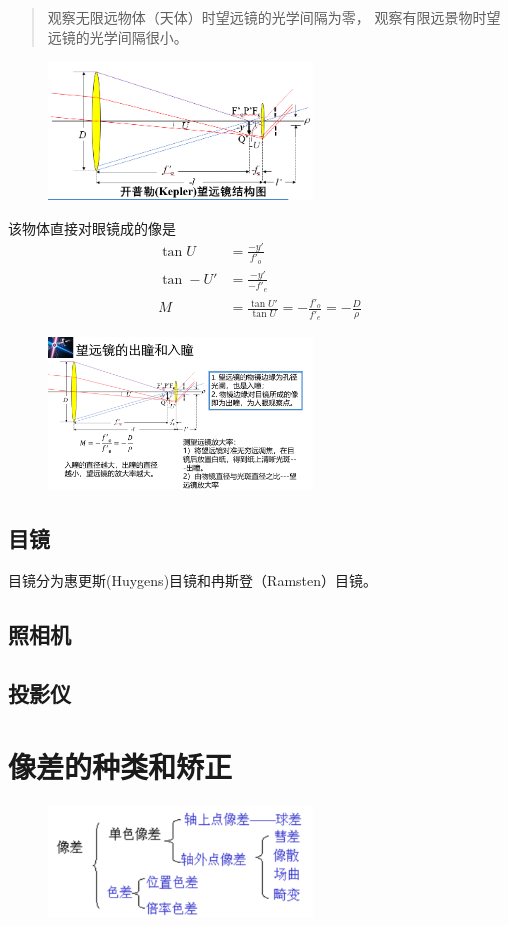 \begin{quote}
{\qquad{}\ccwd\kaishu{}
观察无限远物体（天体）时望远镜的光学间隔为零，
观察有限远景物时望远镜的光学间隔很小。

}
\end{quote}
        \begin{figure}[H]
            \centering
            \includegraphics[width=7cm]{img/6.3.png}
            \end{figure}
该物体直接对眼镜成的像是
\begin{align}
\tan U&=\frac{-y'}{f'_o} \tag{6.3.1.a}\\
\tan -U'&=\frac{-y'}{-f'_e} \tag{6.3.1.b}\\
M&=\frac{\tan U'}{\tan U}=-\frac{f'_o}{f'_e}=-\frac{D}{\rho} \tag{6.3.1.c}
\end{align}
\begin{figure}[H]
    \centering
    \includegraphics[width=7cm]{img/6.5.png}
    \end{figure}
\subsection{目镜}
目镜分为惠更斯(Huygens)目镜和冉斯登（Ramsten）目镜。
\subsection{照相机}
\subsection{投影仪}
\section{像差的种类和矫正}
        \begin{figure}[H]
            \centering
            \includegraphics[width=7cm]{img/6.6.png}
            \end{figure}
